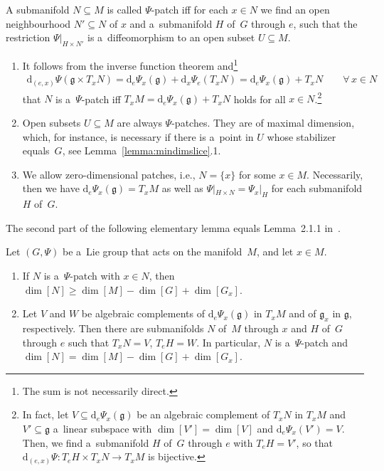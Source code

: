 \begin{Definition}
A submanifold $N\subseteq M$ is called $\Psi$-patch if\/f for each $x\in N$ we find an open neighbourhood $N'\subseteq N$
of $x$ and a~submanifold $H$ of~$G$ through $e$, such that the restriction $\Psi|_{H\times N'}$ is a~dif\/feomorphism to an
open subset $U\subseteq M$.
\end{Definition}

\begin{Remark}\label{rem:patch}\quad
\begin{enumerate}\itemsep=0pt
\item
It follows from the inverse function theorem and\footnote{The sum is not necessarily direct.}
\begin{gather*}
\mathrm{d}_{(e,x)}\Psi(\mathfrak{g}\times T_xN)= \mathrm{d}_e\Psi_x(\mathfrak{g}) + \mathrm{d}_x\Psi_e(T_xN)=
\mathrm{d}_e\Psi_x(\mathfrak{g})+T_xN
\qquad\forall\, x\in N
\end{gather*}
that $N$ is a~$\Psi$-patch if\/f $T_xM= \mathrm{d}_e\Psi_x(\mathfrak{g})+T_xN$ holds for all $x\in N$.\footnote{In fact, let $V\subseteq \mathrm{d}_e\Psi_x(\mathfrak{g})$ be an algebraic complement of $T_xN$ in $T_xM$ and $V'\subseteq
\mathfrak{g}$ a~linear subspace with $\dim[V']=\dim[V]$ and $\mathrm{d}_e\Psi_x(V')=V$.
Then, we f\/ind a~submanifold $H$ of~$G$ through $e$ with $T_eH=V'$, so that $\mathrm{d}_{(e,x)}\Psi\colon T_eH\times T_xN
\rightarrow T_xM$ is bijective.}
\item
Open subsets $U\subseteq M$ are always $\Psi$-patches.
They are of maximal dimension, which, for instance, is necessary if there is a~point in $U$ whose stabilizer equals~$G$,
see Lemma~\ref{lemma:mindimslice}.1.
\item
We allow zero-dimensional patches, i.e., $N=\{x\}$ for some $x\in M$.
Necessarily, then we have $\mathrm{d}_e\Psi_x(\mathfrak{g})=T_xM$ as well as $\Psi|_{H\times N}=\Psi_x|_{H}$ for each submanifold $H$
of~$G$.
\end{enumerate}
\end{Remark}

The second part of the following elementary lemma equals Lemma~2.1.1 in~\cite{DuisKolk}.
\begin{Lemma}\label{lemma:mindimslice}
Let $(G,\Psi)$ be a~Lie group that acts on the manifold~$M$, and let $x\in M$.
\begin{enumerate}\itemsep=0pt%
\item[$1.$]
If $N$ is a~$\Psi$-patch with $x\in N$, then $\dim[N]\geq \dim[M]-\dim[G]+\dim[G_x]$.
\item[$2.$]
Let $V$ and $W$ be algebraic complements of $\mathrm{d}_e\Psi_x(\mathfrak{g})$ in $T_xM$ and of $\mathfrak{g}_x$ in
$\mathfrak{g}$, respectively.
Then there are submanifolds $N$ of~$M$ through $x$ and $H$ of~$G$ through $e$ such that $T_xN=V$, $T_eH=W$.
In particular, $N$ is a~$\Psi$-patch and $\dim[N]=\dim[M]-\dim[G]+\dim[G_x]$.
\end{enumerate}
\end{Lemma}


